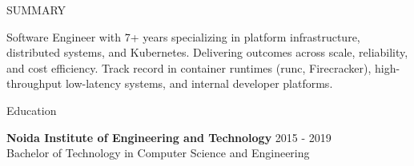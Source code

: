 \documentclass{resume} %
\begin{document}

 \begin{rSection}{SUMMARY}

{Software Engineer with 7+ years specializing in platform infrastructure, distributed systems, and Kubernetes. Delivering outcomes across scale, reliability, and cost efficiency. Track record in container runtimes (runc, Firecracker), high-throughput low-latency systems, and internal developer platforms.}


\end{rSection}

\begin{rSection}{Education}

{\bf Noida Institute of Engineering and Technology}  \hfill \hfill {2015 - 2019}\\
Bachelor of Technology in Computer Science and Engineering


\end{rSection}
\end{document}
